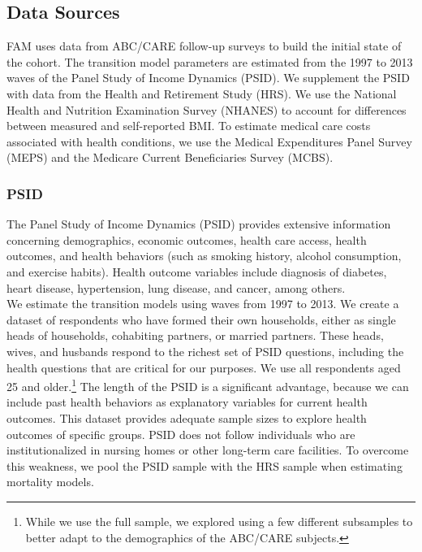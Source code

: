 \subsection{Data Sources} \label{section:data}
\noindent FAM uses data from ABC/CARE follow-up surveys to build the initial state of the cohort. 
The transition model parameters are estimated from the 1997 to 2013 waves of the Panel Study of Income Dynamics (PSID). 
We supplement the PSID with data from the Health and Retirement Study (HRS). We use the National Health and Nutrition Examination Survey (NHANES) 
to account for differences between measured and self-reported BMI.
To estimate medical care costs associated with health conditions, we use the Medical Expenditures Panel Survey (MEPS) and the Medicare Current Beneficiaries Survey (MCBS). \\


\subsubsection{PSID}
\label{section:data_psid}

\noindent The Panel Study of Income Dynamics (PSID) provides extensive information concerning demographics, economic outcomes, health care access, health outcomes, and health behaviors (such as smoking history, alcohol consumption, and exercise habits). Health outcome variables include diagnosis of diabetes, heart disease, hypertension, lung disease, and cancer, among others.\\

\noindent We estimate the transition models using waves from 1997 to 2013. We create a dataset of respondents who have formed their own households, either
as single heads of households, cohabiting partners, or married partners. These heads, wives, and husbands respond to the richest
set of PSID questions, including the health questions that are critical for our purposes. We use all respondents aged 25 and older.\footnote{While we use the full sample, we explored using a few different subsamples to better adapt to the demographics of the ABC/CARE subjects.}  
The length of the PSID is a significant advantage, because we can include past health behaviors as explanatory variables for current health outcomes. This dataset provides adequate sample sizes to explore health outcomes of specific groups. 
PSID does not follow individuals who are institutionalized in nursing homes or other long-term care facilities. To overcome this weakness, we pool the PSID sample with the HRS sample when
estimating mortality models. \\

